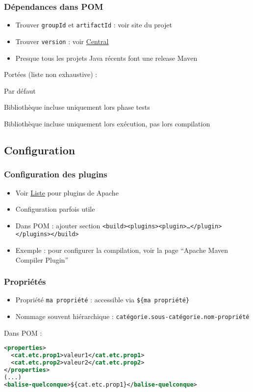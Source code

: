 \documentclass[english, french]{beamer}
\begin{document}
\begin{frame}
	\frametitle{Dépendances dans POM}
	\begin{itemize}
		\item Trouver \texttt{groupId} et \texttt{artifactId} : voir site du projet
		\item Trouver \texttt{version} : voir \href{https://search.maven.org}{Central}
		\item Presque tous les projets Java récents font une release Maven
	\end{itemize}
	Portées {\tiny (liste non exhaustive)} :
	\begin{description}
		\item[\texttt{compile}] Par défaut
		\item[\texttt{test}] Bibliothèque incluse uniquement lors phase tests
		\item[\texttt{runtime}] Bibliothèque incluse uniquement lors exécution, pas lors compilation
	\end{description}
\end{frame}

\subsection{Configuration}
\begin{frame}
	\frametitle{Configuration des plugins}
	\begin{itemize}
		\item Voir \href{https://maven.apache.org/plugins/index.html}{Liste} pour plugins de Apache
		\item Configuration parfois utile
		\item Dans POM : ajouter section \texttt{<build><plugins><plugin>…</plugin></plugins></build>}
		\item Exemple : pour configurer la compilation, voir la page “Apache Maven Compiler Plugin”
	\end{itemize}
\end{frame}

\begin{frame}[fragile]
	\frametitle{Propriétés}
	\begin{itemize}
		\item Propriété \texttt{ma propriété} : accessible via \texttt{\$\{ma propriété\}}
		\item Nommage souvent hiérarchique : \texttt{catégorie.sous-catégorie.nom-propriété}
	\end{itemize}
	Dans POM : 
	\begin{lstlisting}[keywordstyle=\fontspec{Latin Modern Mono Light}\textbf, emph={project, modelVersion, groupId, artifactId, version}, emphstyle=\fontspec{Latin Modern Mono Light}\textbf, language=XML, basicstyle=\small\NoAutoSpacing\ttfamily, aboveskip=0pt, belowskip=0pt, showstringspaces=false]
<properties>
  <cat.etc.prop1>valeur1</cat.etc.prop1>
  <cat.etc.prop2>valeur2</cat.etc.prop2>
</properties>
(...)
<balise-quelconque>${cat.etc.prop1}</balise-quelconque>
		\end{lstlisting}
\end{frame}
\end{document}
